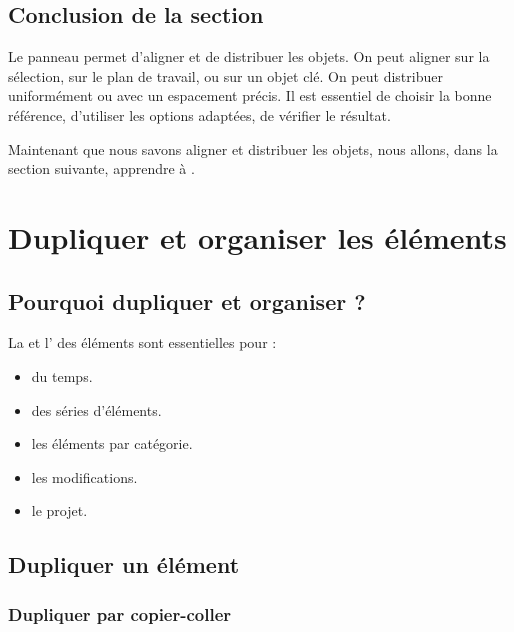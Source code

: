 \subsection*{Conclusion de la section}

Le panneau  permet d'aligner et de distribuer les objets. On peut aligner sur la sélection, sur le plan de travail, ou sur un objet clé. On peut distribuer uniformément ou avec un espacement précis. Il est essentiel de choisir la bonne référence, d'utiliser les options adaptées, de vérifier le résultat.

Maintenant que nous savons aligner et distribuer les objets, nous allons, dans la section suivante, apprendre à .

\section{Dupliquer et organiser les éléments}

\subsection{Pourquoi dupliquer et organiser ?}

La  et l' des éléments sont essentielles pour :

\begin{itemize}
    \item {} du temps.
    \item {} des séries d'éléments.
    \item {} les éléments par catégorie.
    \item {} les modifications.
    \item {} le projet.
\end{itemize}

\subsection{Dupliquer un élément}

\subsubsection{Dupliquer par copier-coller}

